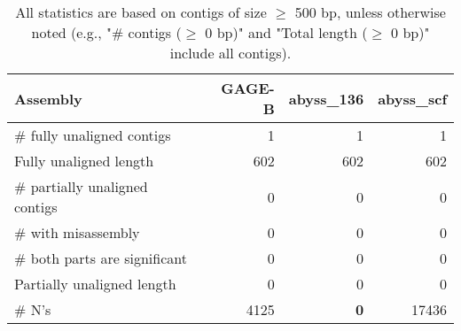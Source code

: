 \documentclass[12pt,a4paper]{article}
\begin{document}
\begin{table}[ht]
\begin{center}
\caption{All statistics are based on contigs of size $\geq$ 500 bp, unless otherwise noted (e.g., "\# contigs ($\geq$ 0 bp)" and "Total length ($\geq$ 0 bp)" include all contigs).}
\begin{tabular}{|l*{3}{|r}|}
\hline
Assembly & GAGE-B & abyss\_136 & abyss\_scf \\ \hline
\# fully unaligned contigs & 1 & 1 & 1 \\ \hline
Fully unaligned length & 602 & 602 & 602 \\ \hline
\# partially unaligned contigs & 0 & 0 & 0 \\ \hline
\hspace{5mm}\# with misassembly & 0 & 0 & 0 \\ \hline
\hspace{5mm}\# both parts are significant & 0 & 0 & 0 \\ \hline
Partially unaligned length & 0 & 0 & 0 \\ \hline
\# N's & 4125 & {\bf 0} & 17436 \\ \hline
\end{tabular}
\end{center}
\end{table}
\end{document}
